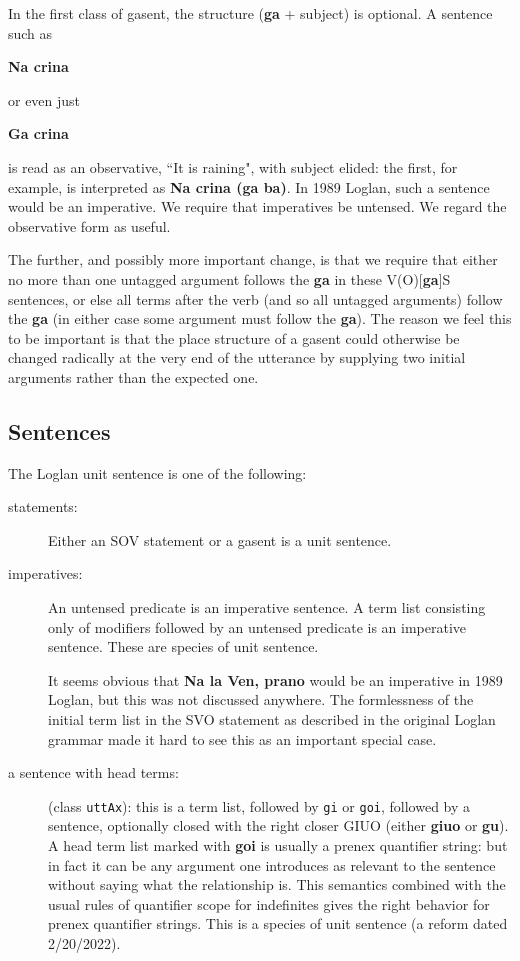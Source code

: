 \documentclass[12pt]{book}
\begin{document}
{In the first class of gasent, the structure ({\bf ga} + subject) is optional.  A sentence such as

{\bf Na crina}

or even just

{\bf Ga crina}

is read as an observative, ``It is raining", with subject elided:  the first, for example,  is interpreted as {\bf Na crina (ga ba)}.  In 1989 Loglan, such a sentence would be an imperative.  We require that
imperatives be untensed.  We regard the observative form as useful.

The further, and possibly more important change, is that we require that either no more than one untagged argument  follows the {\bf ga} in
these V(O)[{\bf ga}]S sentences, or else all terms after the verb (and so all untagged arguments) follow the {\bf ga} (in either case some argument must follow the {\bf ga}).  The reason we feel this to be important is that the place structure of a gasent could otherwise be changed radically at the very end of the utterance by supplying two initial arguments rather than the expected one.



\subsection{Sentences}

The Loglan unit sentence is one of the following:

\begin{description}

\item[statements:]  Either an SOV statement or a gasent is a unit sentence.

\item[imperatives:]  An untensed predicate is an imperative sentence.  A term list consisting only of modifiers followed by an untensed predicate is an imperative sentence.  These are species of unit sentence.

It seems obvious that
{\bf Na la Ven, prano}
would be an imperative in 1989 Loglan, but this was not discussed anywhere.  The formlessness of the initial term list in the SVO statement as described in the original Loglan grammar made it hard to see this as an important special case.

\item[a sentence with head terms:]  (class {\tt uttAx}):  this is a term list, followed by
{\tt gi} or {\tt goi}, followed by a sentence, optionally closed with the right closer GIUO (either {\bf giuo} or {\bf gu}).   A head term list marked
with {\bf goi} is usually a prenex quantifier string:  but in fact it can be any argument one introduces as relevant to the sentence without saying what the relationship is.  This semantics combined with the usual rules of quantifier scope
for indefinites gives the right behavior for prenex quantifier strings.  This is a species of unit sentence (a reform dated 2/20/2022).


\end{description}}
\end{document}
